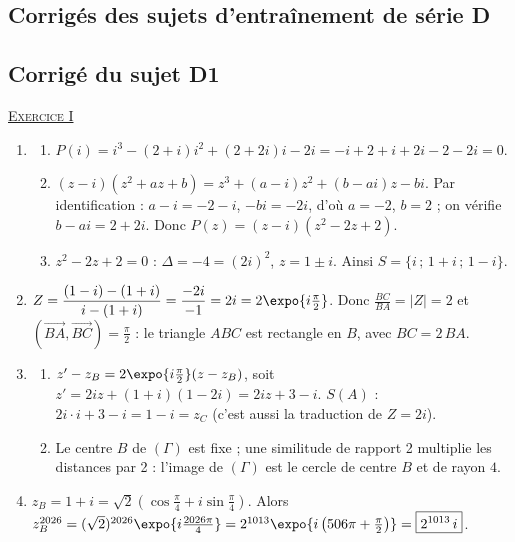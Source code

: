 \begin{corrige}
\newpage
\section{Corrig\'es des sujets d'entra\^inement de s\'erie D}
\subsection{Corrig\'e du sujet D1}
\noindent \underline{\textsc{Exercice I}}
\begin{enumerate}
\item \begin{enumerate}
      \item $P(i) = i^3 - (2+i)i^2 + (2+2i)i - 2i = -i + 2 + i + 2i - 2 - 2i = 0$.
      \item $(z - i)(z^2 + az + b) = z^3 + (a - i)z^2 + (b - ai)z - bi$. Par identification : $a - i = -2 - i$, $-bi = -2i$,
            d'o\`u $a = -2$, $b = 2$ ; on v\'erifie $b - ai = 2 + 2i$. Donc $P(z) = (z - i)(z^2 - 2z + 2)$.
      \item $z^2 - 2z + 2 = 0$ : $\Delta = -4 = (2i)^2$, $z = 1 \pm i$. Ainsi $\boxed{S = \{ i \,;\, 1 + i \,;\, 1 - i \}}$.
      \end{enumerate}
\item $Z = \dfrac{(1 - i) - (1 + i)}{i - (1 + i)} = \dfrac{-2i}{-1} = 2i = 2\expo{i\frac{\pi}{2}}$.
      Donc $\frac{BC}{BA} = |Z| = 2$ et $(\overrightarrow{BA}, \overrightarrow{BC}) = \frac{\pi}{2}$ : le triangle $ABC$ est
      rectangle en $B$, avec $BC = 2\,BA$.
\item \begin{enumerate}
      \item $z' - z_B = 2\expo{i\frac{\pi}{2}}(z - z_B)$, soit $z' = 2iz + (1+i)(1 - 2i) = \boxed{2iz + 3 - i}$.
            $S(A)$ : $2i \cdot i + 3 - i = 1 - i = z_C$ (c'est aussi la traduction de $Z = 2i$).
      \item Le centre $B$ de $(\Gamma)$ est fixe ; une similitude de rapport 2 multiplie les distances par 2 :
            l'image de $(\Gamma)$ est le cercle de centre $B$ et de rayon $4$.
      \end{enumerate}
\item $z_B = 1 + i = \sqrt{2}\left(\cos\frac{\pi}{4} + i \sin\frac{\pi}{4}\right)$. Alors
      $z_B^{2026} = (\sqrt{2})^{2026}\expo{i\frac{2026\pi}{4}} = 2^{1013}\expo{i\left(506\pi + \frac{\pi}{2}\right)} = \boxed{2^{1013}\, i}$.
\end{enumerate}


\end{corrige}
